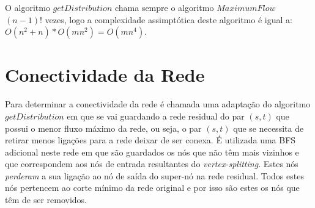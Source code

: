 \documentclass[12pt,a4paper]{article}
\begin{document}
O algoritmo $getDistribution$ chama sempre o algoritmo $MaximumFlow$ $(n-1)!$ vezes, logo a complexidade assimptótica deste algoritmo é igual a: $O(n^2 + n) * O(m n^2) = O(m n^4)$.

\section{Conectividade da Rede}

Para determinar a conectividade da rede é chamada uma adaptação do algoritmo $getDistribution$ em que se vai guardando a rede residual do par $(s,t)$ que possui o menor fluxo máximo da rede, ou seja, o par $(s,t)$ que se necessita de retirar menos ligações para a rede deixar de ser conexa.
É utilizada uma BFS adicional neste rede em que são guardados os nós que não têm mais vizinhos e que correspondem aos nós de entrada resultantes do \textit{vertex-splitting}. Estes nós \textit{perderam}  a sua ligação ao nó de saída do super-nó na rede residual. Todos estes nós pertencem ao corte mínimo da rede original e por isso são estes os nós que têm de ser removidos.
\end{document}
